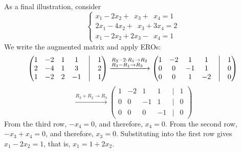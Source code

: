 \begin{example}
\label{ex:infinitely_many_solutions}
As a final illustration, consider
\begin{equation*}
\begin{cases}
x_1 - 2x_2 + \phantom{2}x_3 + \phantom{3}x_4 = 1 \\
2x_1 - 4x_2 + \phantom{2}x_3 + 3x_4 = 2 \\
x_1 - 2x_2 + 2x_3 - \phantom{3}x_4 = 1
\end{cases}
\end{equation*}
We write the augmented matrix and apply EROs:
\[
\begin{pmatrix}
1 & -2 & 1 & 1 & \big| & 1 \\
2 & -4 & 1 & 3 & \big| & 2 \\
1 & -2 & 2 & -1 & \big| & 1
\end{pmatrix}
\xrightarrow{\begin{subarray}{l} R_2 - 2 \cdot R_1 \to R_2 \\ R_3 - R_1 \to R_3 \end{subarray}}
\begin{pmatrix}
1 & -2 & 1 & 1 & \big| & 1 \\
0 & 0 & -1 & 1 & \big| & 0 \\
0 & 0 & 1 & -2 & \big| & 0
\end{pmatrix}
\]
\[
\xrightarrow{R_3 + R_2 \to R_3}
\begin{pmatrix}
1 & -2 & 1 & 1 & \big| & 1 \\
0 & 0 & -1 & 1 & \big| & 0 \\
0 & 0 & 0 & -1 & \big| & 0
\end{pmatrix}
\]
From the third row, $-x_4 = 0$, and therefore, $x_4 = 0$. From the second row, $-x_3 + x_4 = 0$, and therefore, $x_3 = 0$. Substituting into the first row gives $x_1 - 2x_2 = 1$, that is, $x_1 = 1 + 2x_2$.


\end{example}
